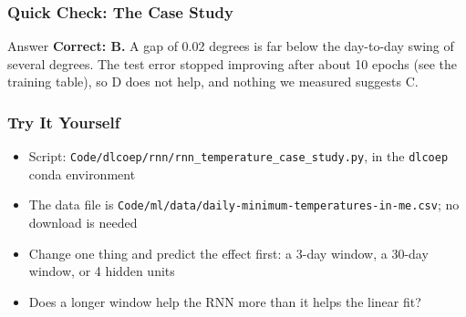 \begin{frame}[fragile]\frametitle{Quick Check: The Case Study}
\begin{block}{Answer}
\textbf{Correct: B.} A gap of 0.02 degrees is far below the day-to-day swing of several degrees. The test error stopped improving after about 10 epochs (see the training table), so D does not help, and nothing we measured suggests C.
\end{block}
\end{frame}

\begin{frame}[fragile]\frametitle{Try It Yourself}
\begin{itemize}
\item Script: \texttt{Code/\allowbreak dlcoep/\allowbreak rnn/\allowbreak rnn\_temperature\_case\_study.py}, in the \texttt{dlcoep} conda environment
\item The data file is \texttt{Code/\allowbreak ml/\allowbreak data/\allowbreak daily-minimum-\allowbreak temperatures-in-me.csv}; no download is needed
\item Change one thing and predict the effect first: a 3-day window, a 30-day window, or 4 hidden units
\item Does a longer window help the RNN more than it helps the linear fit?
\end{itemize}
\end{frame}
